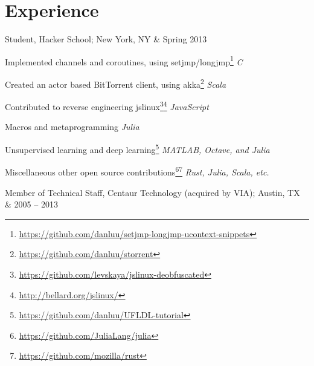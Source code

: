 \documentclass[letterpaper]{scrartcl}
\begin{document}
\section*{Experience}

\begin{list1}
\item \begin{tabular1bold} Student, Hacker School; New York, NY & Spring 2013 \end{tabular1bold}

  \begin{list2}
  \item Implemented channels and coroutines, using setjmp/longjmp\footnote{\href{https://github.com/danluu/setjmp-longjmp-ucontext-snippets}{https://github.com/danluu/setjmp-longjmp-ucontext-snippets}} \hfill \emph{C} 
  \item Created an actor based BitTorrent client, using akka\footnote{\href{https://github.com/danluu/storrent}{https://github.com/danluu/storrent}}             \hfill \emph{Scala}
  \item Contributed to reverse engineering jslinux\footnote{\href{https://github.com/levskaya/jslinux-deobfuscated}{https://github.com/levskaya/jslinux-deobfuscated}}\footnote{\href{http://bellard.org/jslinux/}{http://bellard.org/jslinux/}}    \hfill \emph {JavaScript}
  \item Macros and metaprogramming \hfill \emph {Julia}
  \item Unsupervised learning and deep learning\footnote{\href{https://github.com/danluu/UFLDL-tutorial}{https://github.com/danluu/UFLDL-tutorial}} \hfill \emph {MATLAB, Octave, and Julia}
  \item Miscellaneous other open source contributions\footnote{\href{https://github.com/JuliaLang/julia}{https://github.com/JuliaLang/julia}}\footnote{\href{https://github.com/mozilla/rust}{https://github.com/mozilla/rust}} \hfill \emph {Rust, Julia, Scala, etc.}
  \end{list2}

\item \begin{tabular1bold} Member of Technical Staff, Centaur Technology (acquired by VIA); Austin, TX & 2005 -- 2013 \end{tabular1bold}


\end{list1}
\end{document}

